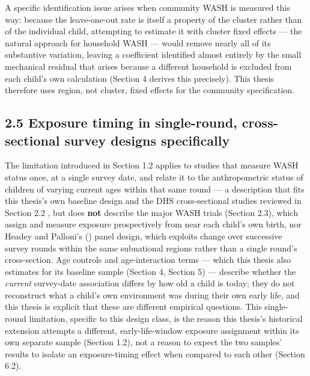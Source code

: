 A specific identification issue arises when community WASH is measured this way: because the leave-one-out rate is itself a property of the cluster rather than of the individual child, attempting to estimate it with cluster fixed effects --- the natural approach for household WASH --- would remove nearly all of its substantive variation, leaving a coefficient identified almost entirely by the small mechanical residual that arises because a different household is excluded from each child's own calculation (Section 4 derives this precisely). This thesis therefore uses region, not cluster, fixed effects for the community specification.

\subsection*{2.5 Exposure timing in single-round, cross-sectional survey designs specifically}

The limitation introduced in Section 1.2 applies to studies that measure WASH status once, at a single survey date, and relate it to the anthropometric status of children of varying current ages within that same round --- a description that fits this thesis's own baseline design and the DHS cross-sectional studies reviewed in Section 2.2 \parencite{Rakotomanana2020,Addae2024,Gunther2010,Spears2013}, but does \textbf{not} describe the major WASH trials (Section 2.3), which assign and measure exposure prospectively from near each child's own birth, nor Headey and Palloni's (\citeyear{HeadeyPalloni2019}) panel design, which exploits change over successive survey rounds within the same subnational regions rather than a single round's cross-section. Age controls and age-interaction terms --- which this thesis also estimates for its baseline sample (Section 4, Section 5) --- describe whether the \textit{current} survey-date association differs by how old a child is today; they do not reconstruct what a child's own environment was during their own early life, and this thesis is explicit that these are different empirical questions. This single-round limitation, specific to this design class, is the reason this thesis's historical extension attempts a different, early-life-window exposure assignment within its own separate sample (Section 1.2), not a reason to expect the two samples' results to isolate an exposure-timing effect when compared to each other (Section 6.2).

